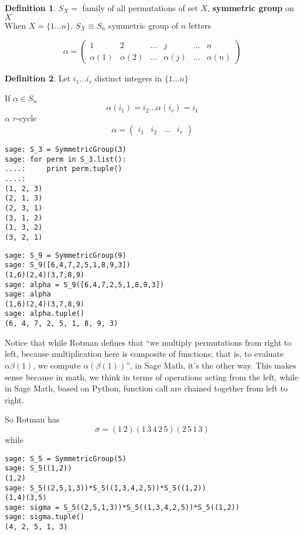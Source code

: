 \documentclass[twoside,landscape]{amsart}
\theoremstyle{plain}
\theoremstyle{definition}
\newtheorem{definition}{Definition}
\theoremstyle{remark}
\begin{document}
\begin{multicols*}{2}
\begin{definition}
  $S_X =  $ family of all permutations of set $X$, \textbf{symmetric group} on $X$ \\
  When $X = \lbrace 1 \dots n\rbrace$, $S_X \equiv S_n$ symmetric group of $n$ letters
\end{definition}


\[
\alpha = \left( \begin{matrix} 1 & 2 & \dots & j & \dots  & n \\ \alpha(1) & \alpha(2) & \dots & \alpha(j) & \dots & \alpha(n) \end{matrix} \right)
\]

\begin{definition}
Let $i_1 \dots i_r$ distinct integers in $\lbrace 1 \dots n \rbrace$

If $\alpha \in S_n$ 
\[
\alpha(i_1) = i_2 \dots \alpha(i_r) = i_1 
\]
$\alpha$ $r$-cycle
\[
\alpha = (\begin{matrix} i_1 & i_2 & \dots & i_r \end{matrix} )
\]
\end{definition}

\begin{lstlisting}
sage: S_3 = SymmetricGroup(3)
sage: for perm in S_3.list():
....:     print perm.tuple()
....:     
(1, 2, 3)
(2, 1, 3)
(2, 3, 1)
(3, 1, 2)
(1, 3, 2)
(3, 2, 1)
\end{lstlisting}

\begin{lstlisting}
sage: S_9 = SymmetricGroup(9)
sage: S_9([6,4,7,2,5,1,8,9,3])
(1,6)(2,4)(3,7,8,9)
sage: alpha = S_9([6,4,7,2,5,1,8,9,3])
sage: alpha
(1,6)(2,4)(3,7,8,9)
sage: alpha.tuple()
(6, 4, 7, 2, 5, 1, 8, 9, 3)
\end{lstlisting}

Notice that while Rotman \cite{JRotman2010} defines that ``we multiply permutations from right to left, because multiplication here is composite of functions; that is, to evaluate $\alpha \beta(1)$, we compute $\alpha (\beta(1))$'', in Sage Math, it's the other way.  This makes sense because in math, we think in terms of operations acting from the left, while in Sage Math, based on Python, function call are chained together from left to right.  

So Rotman has
\[
\sigma = (1 \, 2)(1 \, 3 \, 4 \, 2 \, 5)(2 \, 5 \, 1 \, 3)
\]
while

\begin{lstlisting}
sage: S_5 = SymmetricGroup(5)
sage: S_5((1,2))
(1,2)
sage: S_5((2,5,1,3))*S_5((1,3,4,2,5))*S_5((1,2))
(1,4)(3,5)
sage: sigma = S_5((2,5,1,3))*S_5((1,3,4,2,5))*S_5((1,2))
sage: sigma.tuple()
(4, 2, 5, 1, 3)
\end{lstlisting}


\end{multicols*}
\end{document}
